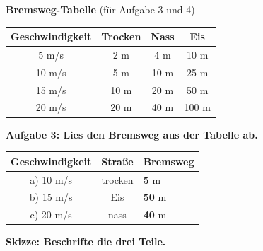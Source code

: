 \documentclass[11pt,a4paper]{article}
\newcommand{\aufgabe}[1]{\textbf{\textcolor{physik}{#1}}}
\newcommand{\lsg}[1]{\textcolor{loesung}{\textbf{#1}}}
\begin{document}
\vspace{0.5em}

\aufgabe{Bremsweg-Tabelle} (für Aufgabe 3 und 4)

\vspace{0.2em}
\begin{merkbox}
\centering
\renewcommand{\arraystretch}{1.3}
\begin{tabular}{|c|c|c|c|}
\hline
\textbf{Geschwindigkeit} & \textbf{Trocken} & \textbf{Nass} & \textbf{Eis} \\
\hline
5 m/s & 2 m & 4 m & 10 m \\
\hline
10 m/s & 5 m & 10 m & 25 m \\
\hline
15 m/s & 10 m & 20 m & 50 m \\
\hline
20 m/s & 20 m & 40 m & 100 m \\
\hline
\end{tabular}
\end{merkbox}

\vspace{0.4em}

\aufgabe{Aufgabe 3: Lies den Bremsweg aus der Tabelle ab.}

\vspace{0.2em}
\renewcommand{\arraystretch}{1.6}
\begin{tabular}{|c|c|l|}
\hline
\textbf{Geschwindigkeit} & \textbf{Straße} & \textbf{Bremsweg} \\
\hline
a) 10 m/s & trocken & \lsg{5} m \\
\hline
b) 15 m/s & Eis & \lsg{50} m \\
\hline
c) 20 m/s & nass & \lsg{40} m \\
\hline
\end{tabular}

\newpage


\aufgabe{Skizze: Beschrifte die drei Teile.}
\end{document}
